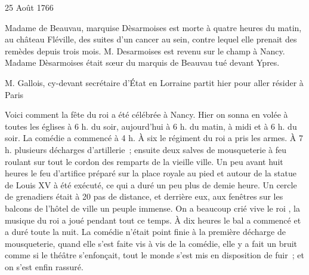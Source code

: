                      \begin{diary}{25 Août 1766}{}
                        
                        
                           Madame
                               de Beauvau, marquise
                              Dèsarmoises est morte à quatre heures
                           du matin, au château
                              Fléville, des suites
                           d'un cancer au sein, contre lequel elle prenait
                           des remèdes depuis trois mois. M.
                              Desarmoises
                           est revenu sur le champ à Nancy.
                              Madame
                              Dèsarmoises était sœur du marquis de
                              Beauvau tué devant Ypres. \bigskip
        
        
                        
                           M. Gallois, cy-devant
                           secrétaire d’État en Lorraine
                           partit
                           hier pour aller résider à Paris
                        \bigskip
        
        
                         Voici comment la fête du
                           roi a été célébrée
                           à Nancy. Hier on sonna en volée
                           à toutes les
                           églises à 6 h. du soir, aujourd'hui à 6 h.
                           du matin, à midi et
                           à 6 h. du soir. La comédie a commencé à 4 h.
                           À six le régiment du roi a pris les armes. À 7 h.
                           plusieurs décharges d'artillerie ; ensuite deux
                           salves de mousqueterie à feu roulant sur tout
                           le cordon des remparts de la vieille ville. Un peu
                           avant huit heures le feu d'artifice préparé
                           sur la place royale au pied et autour de la
                           statue de Louis XV à été exécuté, ce qui a
                           duré un peu plus de demie heure. Un
                           cercle de grenadiers était à 20 pas de
                           distance, et derrière eux, aux fenêtres
                           sur les balcons de l'hôtel de
                              ville un
                           peuple
                           immense. On a beaucoup crié \og vive le roi \fg{},
                           la musique du roi a joué
                           pendant tout
                           ce temps. À dix heures le bal a commencé et a duré toute la nuit. La comédie
                           n'était
                           point finie à la première décharge de
                           mousqueterie, quand elle s'est faite vis
                           à vis de la comédie, elle y a fait un bruit
                           comme si le théâtre s'enfonçait, tout le monde
                           s'est mis en disposition de fuir ; et on s'est
                           enfin rassuré. \bigskip
        
        
                     \end{diary}

